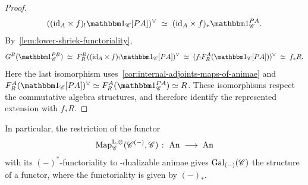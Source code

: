 \documentclass[english,svgnames,table]{article}
\begin{document}
\begin{proof}
        \begin{equation*}
            ((\id_A \times f)_! \ounit_{\cC}[\Path A])\dual \;\simeq\; (\id_A \times f)_* \ounit_{\cC}^{\Path A}.
        \end{equation*}
        By~\cref{lem:lower-shriek-functoriality},
        \begin{equation*}
            G^B(\ounit_{\cC}^{\Path B}) 
            \;\simeq\; F_R^B((\id_A \times f)_! \ounit_{\cC}[\Path A])\dual
            \;\simeq\; (f_! F_R^A(\ounit_{\cC}[\Path A]))\dual
            \;\simeq\; f_* R.
        \end{equation*}
        Here the last isomorphism uses~\cref{cor:internal-adjoints-maps-of-animae} and $F_R^A(\ounit_{\cC}[\Path A])\dual \simeq F_R^A(\ounit_{\cC}^{\Path A}) \simeq R$. These isomorphisms respect the commutative algebra structures, and therefore identify the represented extension with $f_*R$.
    \end{proof}

    \begin{remark}
    \label{rmrk:functoriality-of-galois}
        In particular, the restriction of the functor
        \begin{equation*}
            \operatorname{Map}^{\mathrm{L},\otimes}_{\mathscr{C}}(\mathscr{C}^{(-)}, \mathscr{C}) \;\colon\; \mathrm{An} \;\longrightarrow\; \mathrm{An}
        \end{equation*}
        with its $(-)^*$-functoriality to \CO-dualizable animae gives $\mathrm{Gal}_{(-)}(\mathscr{C})$ the structure of a functor, where the functoriality is given by $(-)_*$.
    \end{remark}
\end{document}
